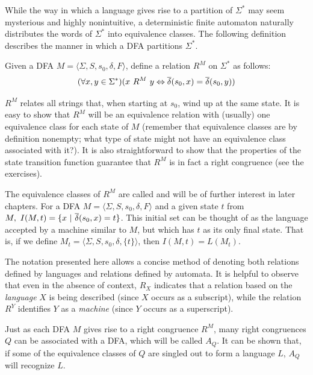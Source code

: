 While the way in which a language gives rise to a partition of $\Sigma^*$ may
seem mysterious and highly nonintuitive, a deterministic finite automaton
naturally distributes the words of $\Sigma^*$ into equivalence classes. The
following definition describes the manner in which a DFA partitions $\Sigma^*$.

\begin{dfn}\label{dfn-2.4}
Given a DFA $M=\langle\Sigma,S,s_0,\delta,F\rangle$, define a relation $R^M$ on
$\Sigma^*$ as follows:
\[ (\forall x,y \in \Sigma^*)(x\ R^M\ y \Leftrightarrow \DBAR(s_0,x) =
	\DBAR(s_0,y)) \]
\end{dfn}

$R^M$ relates all strings that, when starting at $s_0$, wind up at the same
state. It is easy to show that $R^M$ will be an equivalence relation with
(usually) one equivalence class for each state of $M$ (remember that equivalence
classes are by definition nonempty; what type of state might not have an
equivalence class associated with it?). It is also straightforward to show that
the properties of the state transition function guarantee that $R^M$ is in fact
a right congruence (see the exercises).

The equivalence classes of $R^M$ are called \emph{} and will
be of further interest in later chapters. For a DFA $M=\langle\Sigma,S,s_0,
\delta,F\rangle$ and a given state $t$ from $M,\ I(M,t)=\{x\ |\ \DBAR(s_0,x)=t\}$.
This initial set can be thought of as the language accepted by a machine similar
to $M$, but which has $t$ as its only final state. That is, if we define
$M_t=\langle\Sigma,S,s_0,\delta,\{t\}\rangle$, then $I(M,t)=L(M_t)$.

The notation presented here allows a concise method of denoting both relations
defined by languages and relations defined by automata. It is helpful to observe
that even in the absence of context, $R_X$ indicates that a relation based on
the \emph{language} $X$ is being described (since $X$ occurs as a subscript),
while the relation $R^Y$ identifies $Y$ as a \emph{machine} (since $Y$ occurs as a
superscript).

Just as each DFA $M$ gives rise to a right congruence $R^M$, many right
congruences $Q$ can be associated with a DFA, which will be called $A_Q$. It can
be shown that, if some of the equivalence classes of $Q$ are singled out to form
a language $L$, $A_Q$ will recognize $L$.

